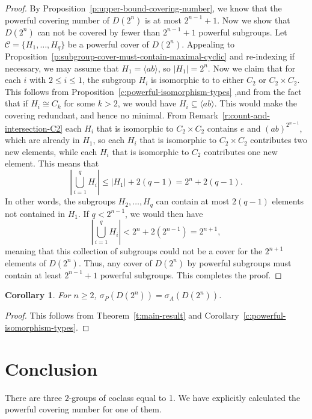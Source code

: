 \documentclass{amsart}
\numberwithin{equation} {section}
\newtheorem{corollary}[equation]{Corollary}
\theoremstyle{definition}
\begin{document}
\begin{proof}
By Proposition~\ref{p:upper-bound-covering-number}, we know that the powerful covering number of $D(2^n)$ is at most $2^{n-1} + 1$. Now we show that $D(2^n)$ can not be covered by fewer than $2^{n-1} + 1$ powerful subgroups. Let $\mathcal{C} = \{ H_1, \ldots, H_q \}$ be a powerful cover of $D(2^n)$. Appealing to Proposition~\ref{p:subgroup-cover-must-contain-maximal-cyclic} and re-indexing if necessary, we may assume that $H_1 = \langle ab \rangle$, so $|H_1| = 2^n$. Now we claim that for each $i$ with $2 \leq i \leq 1$, the subgroup $H_i$ is isomorphic to to either $C_2$ or $C_2 \times C_2$.  This follows from Proposition~\ref{c:powerful-isomorphism-types} ,and from the fact that if $H_i \cong C_k$ for some $k > 2$, we would have $H_i \subseteq \langle ab \rangle$. This would make the covering redundant, and hence no minimal. 
From Remark~\ref{r:count-and-intersection-C2} each $H_i$ that is isomorphic to $C_2 \times C_2$ contains $e$ and $(ab)^{2^{n-1}}$, which are already in $H_1$, so each $H_i$ that is isomorphic to $C_2 \times C_2$ contributes two new elements, while each $H_i$ that is isomorphic to $C_2$ contributes one new element.  This means that
\[
\left| \bigcup_{i=1}^q H_i \right| \leq |H_1| + 2(q -1) = 2^{n} + 2(q-1).
\]
In other words, the subgroups $H_2, \ldots, H_q$ can contain at most $2(q-1)$ elements not contained in $H_1$.
If $q < 2^{n-1}$, we would then have \[
\left| \bigcup_{i=1}^q H_i \right| < 2^{n} + 2(2^{n-1}) = 2^{n+1},
\] meaning that this collection of subgroups could not be a cover for the $2^{n+1}$ elements of $D(2^n)$. Thus, any cover of $D(2^n)$ by powerful subgroups must contain at least $2^{n-1} + 1$ powerful subgroups. This completes the proof. 
\end{proof} 

\begin{corollary}
For $n \geq 2$, $\sigma_P(D(2^n)) = \sigma_A(D(2^n))$.
\end{corollary}

\begin{proof}
This follows from Theorem~\ref{t:main-result} and Corollary~\ref{c:powerful-isomorphism-types}.
\end{proof}

\section{Conclusion}

There are three $2$-groups of coclass equal to 1. We have explicitly calculated the powerful covering number for one of them. 

 

\end{document}
